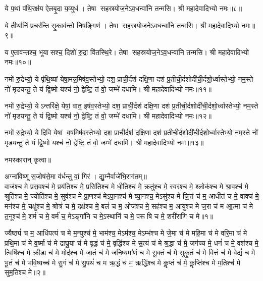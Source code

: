ये प॒थां प॑थि॒रक्ष॑य ऐलबृ॒दा य॒व्युध॑। तेषा सहस्रयोज॒ने\-ऽव॒धन्वा॑नि तन्मसि। श्री महादेवादिभ्यो नमः॥८॥

ये ती॒र्थानि॑ प्र॒चर॑न्ति सृ॒काव॑न्तो निष॒ङ्गिण॑। तेषा सहस्रयोज॒ने\-ऽव॒धन्वा॑नि तन्मसि। श्री महादेवादिभ्यो नमः॥९॥

य ए॒ताव॑न्तश्च॒ भूयासश्च॒ दिशो॑ रु॒द्रा वि॑तस्थि॒रे। तेषा सहस्रयोज॒ने\-ऽव॒धन्वा॑नि तन्मसि। श्री महादेवादिभ्यो नमः॥१०॥

नमो॑ रु॒द्रेभ्यो॒ ये पृ॑थि॒व्यां येषा॒मन्न॒मिष॑व॒स्तेभ्यो॒ दश॒ प्राची॒र्दश॑ दक्षि॒णा दश॑ प्र॒तीची॒र्दशो\-दी॑ची॒र्दशो॒र्ध्वास्तेभ्यो॒ नम॒स्ते नो॑ मृडयन्तु॒ ते यं द्वि॒ष्मो यश्च॑ नो॒ द्वेष्टि॒ तं वो॒ जम्भे॑ दधामि। श्री महादेवादिभ्यो नमः॥११॥ 

नमो॑ रु॒द्रेभ्यो॒ येऽन्तरि॑क्षे॒ येषां॒ वात॒ इष॑व॒स्तेभ्यो॒ दश॒ प्राची॒र्दश॑ दक्षि॒णा दश॑ प्र॒तीची॒र्दशो\-दी॑ची॒र्दशो॒र्ध्वास्तेभ्यो॒ नम॒स्ते नो॑ मृडयन्तु॒ ते यं द्वि॒ष्मो यश्च॑ नो॒ द्वेष्टि॒ तं वो॒ जम्भे॑ दधामि। श्री महादेवादिभ्यो नमः॥१२॥ 

नमो॑ रु॒द्रेभ्यो॒ ये दि॒वि येषां व॒\ar षमिष॑व॒स्तेभ्यो॒ दश॒ प्राची॒र्दश॑ दक्षि॒णा दश॑ प्र॒तीची॒र्दशो\-दी॑ची॒र्दशो॒र्ध्वास्तेभ्यो॒ नम॒स्ते नो॑ मृडयन्तु॒ ते यं द्वि॒ष्मो यश्च॑ नो॒ द्वेष्टि॒ तं वो॒ जम्भे॑ दधामि। श्री महादेवादिभ्यो नमः॥१३॥ 

नमस्कारान् कृत्वा॥

{\small \closesection}


अग्ना॑विष्णू स॒जोष॑से॒मा व॑र्धन्तु वां॒ गिर॑। द्यु॒म्नैर्वाजे॑भि॒राग॑तम्॥ \\
वाज॑श्च मे प्रस॒वश्च॑ मे॒ प्रय॑तिश्च मे॒ प्रसि॑तिश्च मे धी॒तिश्च॑ मे॒ क्रतु॑श्च मे॒ स्वर॑श्च मे॒ श्लोक॑श्च मे श्रा॒वश्च॑ मे॒ श्रुति॑श्च मे॒ ज्योति॑श्च मे॒ सुव॑श्च मे प्रा॒णश्च॑ मेऽपा॒नश्च॑ मे व्या॒नश्च॒ मेऽसु॑श्च मे चि॒त्तं च॑ म॒ आधी॑तं च मे॒ वाक्च॑ मे॒ मन॑श्च मे॒ चक्षु॑श्च मे॒ श्रोत्रं॑ च मे॒ दक्ष॑श्च मे॒ बलं॑ च म॒ ओज॑श्च मे॒ सह॑श्च म॒ आयु॑श्च मे ज॒रा च॑ म आ॒त्मा च॑ मे त॒नूश्च॑ मे॒ शर्म॑ च मे॒ वर्म॑ च॒ मेऽङ्गा॑नि च मे॒ऽस्थानि॑ च मे॒ परूषि च मे॒ शरी॑राणि च मे॥१॥ 

ज्यैष्ठ्यं॑ च म॒ आधि॑पत्यं च मे म॒न्युश्च॑ मे॒ भाम॑श्च॒ मेऽम॑श्च॒ मेऽम्भ॑श्च मे जे॒मा च॑ मे महि॒मा च॑ मे वरि॒मा च॑ मे प्रथि॒मा च॑ मे व॒र्ष्मा च॑ मे द्राघु॒या च॑ मे वृ॒द्धं च॑ मे॒ वृद्धि॑श्च मे स॒त्यं च॑ मे श्र॒द्धा च॑ मे॒ जग॑च्च मे॒ धनं॑ च मे॒ वश॑श्च मे॒ त्विषि॑श्च मे क्री॒डा च॑ मे॒ मोद॑श्च मे जा॒तं च॑ मे जनि॒ष्यमा॑णं च मे सू॒क्तं च॑ मे सुकृ॒तं च॑ मे वि॒त्तं च॑ मे॒ वेद्यं॑ च मे भू॒तं च॑ मे भवि॒ष्यच्च॑ मे सु॒गं च॑ मे सु॒पथं॑ च म ऋ॒द्धं च॑ म॒ ऋद्धि॑श्च मे कॢ॒प्तं च॑ मे॒ कॢप्ति॑श्च मे म॒तिश्च॑ मे सुम॒तिश्च॑ मे॥२॥ 

